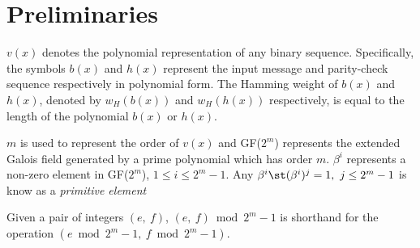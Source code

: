\section{Preliminaries}
\label{secPrelim}
$v(x)$ denotes the polynomial representation of any binary sequence. 
Specifically, the symbols $b(x)$ and $h(x)$ represent the input message and parity-check sequence respectively in polynomial form. 
The Hamming weight of $b(x)$ and $h(x)$, denoted by $w_H(b(x))$ and $w_H(h(x))$ respectively, is equal to the length of the polynomial $b(x)$ or $h(x)$.

$m$ is used to represent the order of $v(x)$ and GF($2^{m}$) represents the extended Galois field generated by a prime polynomial which has order $m$.
$\beta^i$ represents a non-zero element in  GF($2^{m}$), $1 \leq i \leq 2^m-1$.
Any $\beta^i \st (\beta^i)^j=1,~j\leq 2^m-1$ is know as a \textit{primitive element}

Given a pair of integers $(e,~f)$, $(e,~f) \bmod 2^m-1$ is shorthand for the operation $(e \bmod 2^m-1,~f \bmod 2^m-1)$.





